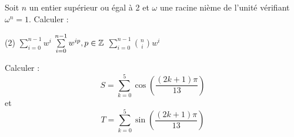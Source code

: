 \begin{exercise}[subtitle=Sommes et racines nièmes, difficulty=*]
	Soit $n$ un entier supérieur ou égal à 2 et $\omega$ une racine nième de l'unité vérifiant $\omega^n=1$. Calculer :
	\begin{tasks}(2)
		\task  $\sum\limits_{i=0}^{n-1} w^i$
		\task $\sum\limits_{i=0}^{n-1} w^{ip}, p\in \mathbb{Z}$
		\task $\sum\limits_{i=0}^{n-1} \binom{n}{i} w^{i}$
		\end{tasks}
\end{exercise}

\begin{exercise}[subtitle=Somme de cosinus, difficulty=*]
	Calculer :
	$$S = \sum\limits_{k=0}^{5} \cos(\frac{(2k+1)\pi}{13})$$
	et 
	$$T = \sum\limits_{k=0}^{5} \sin(\frac{(2k+1)\pi}{13})$$
\end{exercise}
